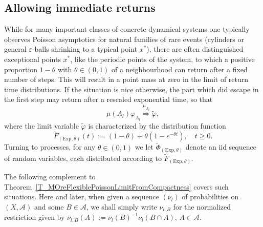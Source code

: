 \documentclass[10pt]{amsart}
\theoremstyle{definition}\newtheorem{defi}[theo]{Definition}\newtheorem{rema}[theo]{Remark}\newtheorem{exam}[theo]{Example}\newtheorem{exem}[theo]{Example}\newtheorem{nota}[theo]{Notation}
\newcommand{\clA}{\mathcal{A}}
\newcommand{\Expl}{\mathrm{Exp}}
\begin{document}
\subsection{Allowing immediate returns}
While for many important classes of concrete dynamical systems one typically observes Poisson asymptotics for natural families of rare events (cylinders or general $\varepsilon$-balls shrinking to a typical point $x^{\ast}$), there are often distinguished exceptional points $x^{\ast}$, like the periodic points of the system, to which a positive proportion $1-\theta$ with $\theta\in(0,1)$ of a neighbourhood can return after a fixed number of steps. This will result in a point mass at zero in the limit of return time distributions. If the situation is nice otherwise, the part which did escape in the first step may return after a rescaled exponential time, so that
\[
\mu(A_{l})\varphi_{A_{l}}
\overset{\mu_{A_{l}}}{\Longrightarrow}\widetilde{\varphi},
\]
where the limit variable $\widetilde{\varphi}$ is characterized by the distribution function
\begin{equation}\label{Eq_DefOneDimDFComp}
\widetilde{F}_{(\Expl,\theta)}(t):=(1-\theta)+\theta\left(1-e^{-\theta t}\right), \quad t\geq0. 
\end{equation}
Turning to processes, for any $\theta\in(0,1)$ we let $\widetilde{\Phi }_{(\Expl,\theta)}$ denote an iid sequence of random variables, each distributed according to $\widetilde{F}_{(\Expl,\theta)}$.

The following complement to Theorem~\ref{T_MOreFlexiblePoissonLimitFromCompactness} covers such situations. Here and later, when given a sequence $(\nu_{l})$ of probabilities on $(X,\clA)$ and some $B\in\clA$, we shall simply write $\nu _{l,B}$ for the normalized restriction given by $\nu_{l,B}(A):=\nu_{l} (B)^{-1}\nu_{l}(B\cap A)$, $A\in\clA$.
\end{document}
